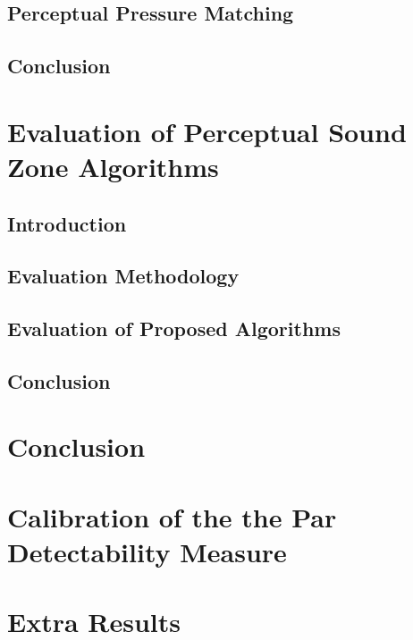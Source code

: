 \documentclass[10pt,twoside,openright,titlepage]{ce}
\begin{document}
\section{Perceptual Pressure Matching}
\label{ch:perceptual_sound_zone:perceptual_minimization}

\newpage
\section{Conclusion}
\label{ch:perceptual_sound_zone:conclusion}


\chapter{Evaluation of Perceptual Sound Zone Algorithms}
\label{ch:results}
\section{Introduction}
\label{ch:results:introduction}

\newpage
\section{Evaluation Methodology}

\newpage
\section{Evaluation of Proposed Algorithms}

\newpage
\section{Conclusion}
\label{ch:results:conclusion}


\chapter{Conclusion}




\appendix
\chapter{Calibration of the the Par Detectability Measure}
\label{ch:perceptual:implementation:calibration}

\newpage
\chapter{Extra Results}

\newpage
\end{document}
